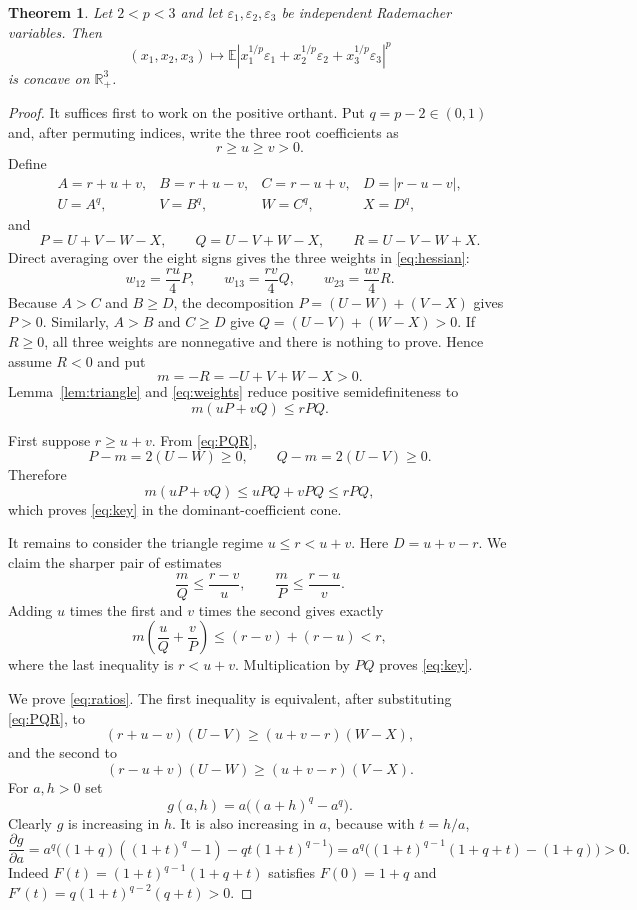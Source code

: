 \documentclass[11pt]{article}
\newtheorem{theorem}{Theorem}
\newcommand{\E}{\mathbb E}
\newcommand{\R}{\mathbb R}
\newcommand{\eps}{\varepsilon}
\begin{document}
\begin{theorem}\label{thm:main}
Let $2<p<3$ and let $\eps_1,\eps_2,\eps_3$ be independent Rademacher
variables.  Then
\[
 (x_1,x_2,x_3)\longmapsto
 \E\left|x_1^{1/p}\eps_1+x_2^{1/p}\eps_2+x_3^{1/p}\eps_3\right|^p
\]
is concave on $\R_+^3$.
\end{theorem}

\begin{proof}
It suffices first to work on the positive orthant.  Put $q=p-2\in(0,1)$ and,
after permuting indices, write the three root coefficients as
\[
 r\geq u\geq v>0.
\]
Define
\[
 \begin{array}{llll}
 A=r+u+v,&B=r+u-v,&C=r-u+v,&D=|r-u-v|,\\
 U=A^q,&V=B^q,&W=C^q,&X=D^q,
 \end{array}
\]
and
\[
 P=U+V-W-X,\qquad Q=U-V+W-X,\qquad
 R=U-V-W+X.
\tag{5}\label{eq:PQR}
\]
Direct averaging over the eight signs gives the three weights in
\eqref{eq:hessian}:
\[
 w_{12}=\frac{ru}{4}P,\qquad
 w_{13}=\frac{rv}{4}Q,\qquad
 w_{23}=\frac{uv}{4}R.
\tag{6}\label{eq:weights}
\]
Because $A>C$ and $B\geq D$, the decomposition
$P=(U-W)+(V-X)$ gives $P>0$.  Similarly, $A>B$ and $C\geq D$ give
$Q=(U-V)+(W-X)>0$.  If $R\geq0$, all three weights are
nonnegative and there is nothing to prove.  Hence assume $R<0$ and put
\[
 m=-R=-U+V+W-X>0.
\]
Lemma~\ref{lem:triangle} and \eqref{eq:weights} reduce positive
semidefiniteness to
\[
 m(uP+vQ)\leq rPQ.
\tag{7}\label{eq:key}
\]

First suppose $r\geq u+v$.  From \eqref{eq:PQR},
\[
 P-m=2(U-W)\geq0,\qquad Q-m=2(U-V)\geq0.
\]
Therefore
\[
 m(uP+vQ)\leq uPQ+vPQ\leq rPQ,
\]
which proves \eqref{eq:key} in the dominant-coefficient cone.

It remains to consider the triangle regime $u\leq r<u+v$.  Here
$D=u+v-r$.  We claim the sharper pair of estimates
\[
 \frac mQ\leq\frac{r-v}{u},\qquad
 \frac mP\leq\frac{r-u}{v}.
\tag{8}\label{eq:ratios}
\]
Adding $u$ times the first and $v$ times the second gives exactly
\[
 m\left(\frac uQ+\frac vP\right)\leq(r-v)+(r-u)<r,
\]
where the last inequality is $r<u+v$.  Multiplication by $PQ$ proves
\eqref{eq:key}.

We prove \eqref{eq:ratios}.  The first inequality is equivalent, after
substituting \eqref{eq:PQR}, to
\[
 (r+u-v)(U-V)\geq(u+v-r)(W-X),
\tag{9}\label{eq:ratio1}
\]
and the second to
\[
 (r-u+v)(U-W)\geq(u+v-r)(V-X).
\tag{10}\label{eq:ratio2}
\]
For $a,h>0$ set
\[
 g(a,h)=a\big((a+h)^q-a^q\big).
\]
Clearly $g$ is increasing in $h$.  It is also increasing in $a$, because
with $t=h/a$,
\[
 \frac{\partial g}{\partial a}
 =a^q\big((1+q)((1+t)^q-1)-qt(1+t)^{q-1}\big)
 =a^q\big((1+t)^{q-1}(1+q+t)-(1+q)\big)>0.
\]
Indeed $F(t)=(1+t)^{q-1}(1+q+t)$ satisfies
$F(0)=1+q$ and $F'(t)=q(1+t)^{q-2}(q+t)>0$.


\end{proof}
\end{document}

